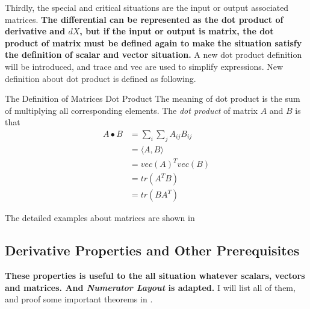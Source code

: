 		 \par Thirdly, the special and critical situations are the input or output associated matrices. \textbf{The differential can be represented as the dot product of derivative and $dX$, but if the input or output is matrix, the dot product of matrix must be defined again to make the situation satisfy the definition of scalar and vector situation.} A new dot product definition will be introduced, and trace and vec are used to simplify expressions. New definition about dot product is defined as following.
		 \begin{defn}{The Definition of Matrices Dot Product}{}
		 	The meaning of dot product is the sum of multiplying all corresponding elements. The \emph{dot product} of matrix $A$ and $B$ is that
		 	\begin{equation*}
		 	\begin{split}
			 	A\bullet B&= \sum_{i}\sum_{j}A_{ij}B_{ij}\\
			 	&=\langle A,B\rangle \\
			 	&=vec(A)^Tvec(B) \\
			 	&=tr(A^TB)\\
			 	&=tr(BA^T)
		 	\end{split}
	 		\end{equation*}
		 \end{defn}
	 	
	 	The detailed examples about matrices are shown in 
	 
	\subsection{Derivative Properties and Other Prerequisites}
		\textbf{These properties is useful to the all situation whatever scalars, vectors and matrices. And \emph{Numerator Layout} is adapted.} I will list all of them, and proof some important theorems in .
		
